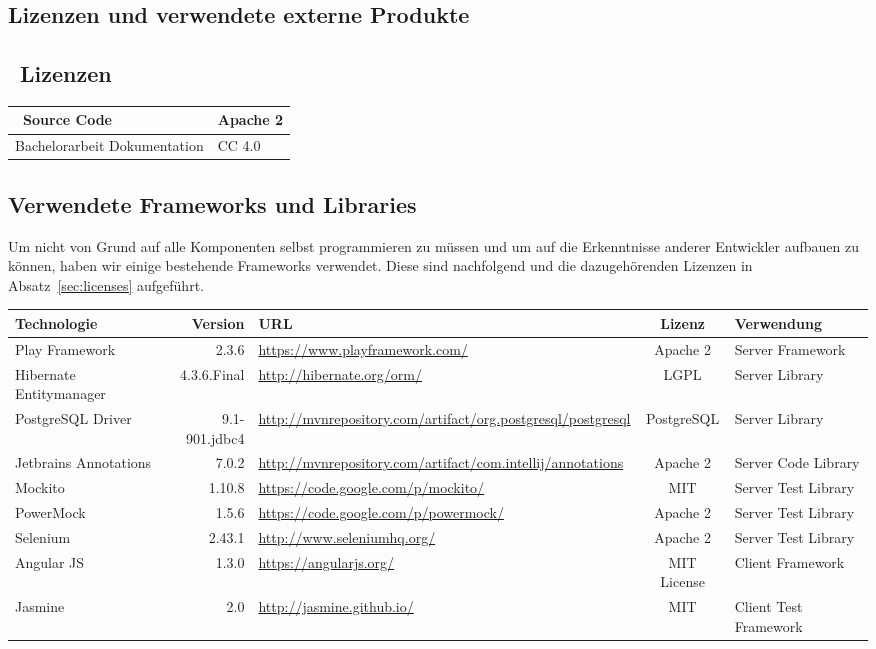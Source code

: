 \begin{landscape}
\chapter{Lizenzen und verwendete externe Produkte}
	\section{\eeppi\ Lizenzen}
		\label{sec:eeppiLisences}
	
	\begin{tabularx}{\linewidth}{|l|X|}
		\hline
		\eeppi\ Source Code & Apache 2\\
		\hline
		Bachelorarbeit Dokumentation & CC 4.0\\
		\hline
	\end{tabularx}
	

	\section{Verwendete Frameworks und Libraries}		
	Um nicht von Grund auf alle Komponenten selbst programmieren zu müssen 
	und um auf die Erkenntnisse anderer Entwickler aufbauen zu können,
	haben wir einige bestehende Frameworks verwendet.
	Diese sind nachfolgend und die dazugehörenden Lizenzen in Absatz~\ref{sec:licenses} aufgeführt.
	
	
	\vspace{0.5cm}
	
	\newcommand{\addLib}[5]{
		#1 & #2 & \url{#3} & #4 & #5 \\
		\hline
	}
	
	
	\begin{tabularx}{\linewidth}{| l r | X | c | l |}
		\hline
		\textbf{Technologie} & \textbf{Version} & \textbf{URL} & \textbf{Lizenz} & \textbf{Verwendung} \\
		\hline \hline
		\addLib{Play Framework}{2.3.6}{https://www.playframework.com/}{Apache 2}{Server Framework}
		\addLib{Hibernate Entitymanager}{4.3.6.Final}{http://hibernate.org/orm/}{LGPL}{Server Library}
		\addLib{PostgreSQL Driver}{9.1-901.jdbc4}{http://mvnrepository.com/artifact/org.postgresql/postgresql}{PostgreSQL}{Server Library}
		\addLib{Jetbrains Annotations}{7.0.2}{http://mvnrepository.com/artifact/com.intellij/annotations}{Apache 2}{Server Code Library}
		\addLib{Mockito}{1.10.8}{https://code.google.com/p/mockito/}{MIT}{Server Test Library}
		\addLib{PowerMock}{1.5.6}{https://code.google.com/p/powermock/}{Apache 2}{Server Test Library}
		\addLib{Selenium}{2.43.1}{http://www.seleniumhq.org/}{Apache 2}{Server Test Library}
		\addLib{Angular JS}{1.3.0}{https://angularjs.org/}{MIT License}{Client Framework}
		\addLib{Jasmine}{2.0}{http://jasmine.github.io/}{MIT}{Client Test Framework}
	\end{tabularx}


\end{landscape}

